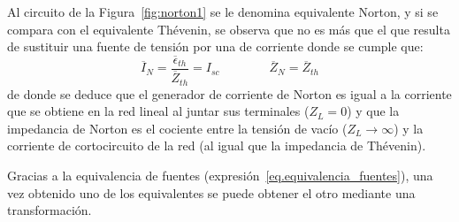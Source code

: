 Al circuito de la Figura~\ref{fig:norton1} se le denomina
equivalente Norton, y si se compara con el equivalente Thévenin, se
observa que no es más que el que resulta de sustituir una fuente de
tensión por una de corriente donde se cumple que:
\begin{equation}
  \boxed{\overline{I}_N=\dfrac{\overline{\epsilon}_{th}}{\overline{Z}_{th}}= I_{sc}} \qquad\qquad \boxed{\overline{Z}_N=\overline{Z}_{th}}
\end{equation}
de donde se deduce que el generador de corriente de Norton es igual a
la corriente que se obtiene en la red lineal al juntar sus terminales
($Z_L=0$) y que la impedancia de Norton es el cociente entre la
tensión de vacío ($Z_L \to \infty$) y la corriente de cortocircuito de la
red (al igual que la impedancia de Thévenin).
\begin{remark}
  Gracias a la equivalencia de fuentes
  (expresión~\eqref{eq.equivalencia_fuentes}), una vez obtenido uno de
  los equivalentes se puede obtener el otro mediante una
  transformación.
\end{remark}

